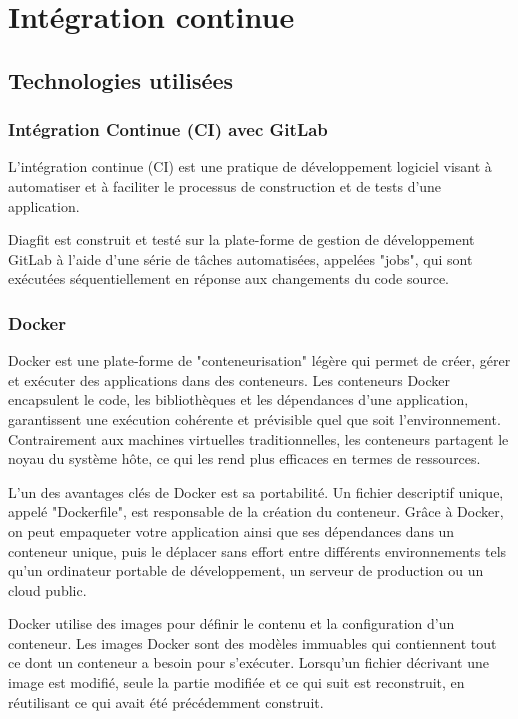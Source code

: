 \newpage
\section{Intégration continue}
\subsection{Technologies utilisées}
\subsubsection{Intégration Continue (CI) avec GitLab}
L'intégration continue (CI) est une pratique de développement logiciel visant à automatiser et à faciliter le processus de construction et de tests d'une application.

Diagfit est construit et testé sur la plate-forme de gestion de développement GitLab à l'aide d'une série de tâches automatisées, appelées "jobs", qui sont exécutées séquentiellement en réponse aux changements du code source.

\subsubsection{Docker}
Docker est une plate-forme de "conteneurisation" légère qui permet de créer, gérer et exécuter des applications dans des conteneurs.
Les conteneurs Docker encapsulent le code, les bibliothèques et les dépendances d'une application, garantissent une exécution cohérente et prévisible quel que soit l'environnement.
Contrairement aux machines virtuelles traditionnelles, les conteneurs partagent le noyau du système hôte, ce qui les rend plus efficaces en termes de ressources.

L'un des avantages clés de Docker est sa portabilité.
Un fichier descriptif unique, appelé "Dockerfile", est responsable de la création du conteneur.
Grâce à Docker, on peut empaqueter votre application ainsi que ses dépendances dans un conteneur unique, puis le déplacer sans effort entre différents environnements tels qu'un ordinateur portable de développement, un serveur de production ou un cloud public.

Docker utilise des images pour définir le contenu et la configuration d'un conteneur.
Les images Docker sont des modèles immuables qui contiennent tout ce dont un conteneur a besoin pour s'exécuter.
Lorsqu'un fichier décrivant une image est modifié, seule la partie modifiée et ce qui suit est reconstruit, en réutilisant ce qui avait été précédemment construit.

